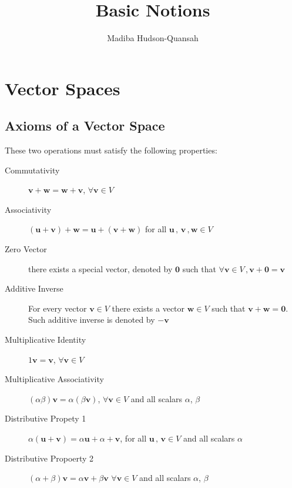 \documentclass[12pt letter]{report}
\title{\Huge{Basic Notions}}
\author{\huge{Madiba Hudson-Quansah}}
\date{}
\begin{document}
\maketitle
\newpage
{}
\tableofcontents
\pagebreak


\chapter{Vector Spaces}
\section{Axioms of a Vector Space}

These two operations must satisfy the following properties:
\begin{description}
  \item[Commutativity] $\mathbf{v} + \mathbf{w} = \mathbf{w} + \mathbf{v} $, $\forall \mathbf{v} \in V$
  \item[Associativity] $\left( \mathbf{u} + \mathbf{v} \right) + \mathbf{w} = \mathbf{u} + \left( \mathbf{v} +
          \mathbf{w}  \right)  $ for all $\mathbf{u}\, , \, \mathbf{v}\, , \mathbf{w} \in V$
  \item[Zero Vector] there exists a special vector, denoted by $\mathbf{0}$ such that $\forall \mathbf{v} \in V\, ,
          \mathbf{v} + \mathbf{0} = \mathbf{v} $
  \item[Additive Inverse] For every vector $\mathbf{v} \in V$ there exists a vector $\mathbf{w} \in V$ such that
        $\mathbf{v} + \mathbf{w} = \mathbf{0}$. Such additive inverse is denoted by $-\mathbf{v}$
  \item[Multiplicative Identity] $1\mathbf{v} = \mathbf{v}$, $\forall \mathbf{v} \in V$
  \item[Multiplicative Associativity] $\left( \alpha \beta \right) \mathbf{v} = \alpha \left( \beta\mathbf{v} \right)$,
        $\forall \mathbf{v} \in V$ and all scalars $\alpha$, $\beta$
  \item[Distributive Propety 1] $\alpha \left( \mathbf{u} + \mathbf{v} \right) = \alpha \mathbf{u} + \alpha +
          \mathbf{v}$, for all $\mathbf{u}\, , \, \mathbf{v} \in V$ and all scalars $\alpha$
  \item[Distributive Propoerty 2] $\left( \alpha + \beta \right)\mathbf{v} = \alpha\mathbf{v} + \beta\mathbf{v} $
        $\forall \mathbf{v} \in V$ and all scalars $\alpha$, $\beta$
\end{description}
\end{document}
